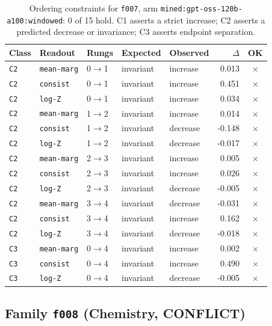 \documentclass[11pt]{article}
\begin{document}
\begin{table}[htbp]
\centering
\small
\caption{Ordering constraints for \texttt{f007}, arm \texttt{mined:gpt-oss-120b-a100:windowed}: 0 of 15 hold. C1 asserts a strict increase; C2 asserts a predicted decrease or invariance; C3 asserts endpoint separation.}
\label{tab:ladder-f007-mined-gpt-oss-120b-a100-windowed}
\begin{tabular}{lllllrc}
\toprule
Class & Readout & Rungs & Expected & Observed & $\Delta$ & OK \\
\midrule
\texttt{C2} & \texttt{mean-marg} & 0$\to$1 & invariant & increase & 0.013 & $\times$ \\
\texttt{C2} & \texttt{consist} & 0$\to$1 & invariant & increase & 0.451 & $\times$ \\
\texttt{C2} & \texttt{log-Z} & 0$\to$1 & invariant & increase & 0.034 & $\times$ \\
\texttt{C2} & \texttt{mean-marg} & 1$\to$2 & invariant & increase & 0.014 & $\times$ \\
\texttt{C2} & \texttt{consist} & 1$\to$2 & invariant & decrease & -0.148 & $\times$ \\
\texttt{C2} & \texttt{log-Z} & 1$\to$2 & invariant & decrease & -0.017 & $\times$ \\
\texttt{C2} & \texttt{mean-marg} & 2$\to$3 & invariant & increase & 0.005 & $\times$ \\
\texttt{C2} & \texttt{consist} & 2$\to$3 & invariant & increase & 0.026 & $\times$ \\
\texttt{C2} & \texttt{log-Z} & 2$\to$3 & invariant & decrease & -0.005 & $\times$ \\
\texttt{C2} & \texttt{mean-marg} & 3$\to$4 & invariant & decrease & -0.031 & $\times$ \\
\texttt{C2} & \texttt{consist} & 3$\to$4 & invariant & increase & 0.162 & $\times$ \\
\texttt{C2} & \texttt{log-Z} & 3$\to$4 & invariant & decrease & -0.018 & $\times$ \\
\texttt{C3} & \texttt{mean-marg} & 0$\to$4 & invariant & increase & 0.002 & $\times$ \\
\texttt{C3} & \texttt{consist} & 0$\to$4 & invariant & increase & 0.490 & $\times$ \\
\texttt{C3} & \texttt{log-Z} & 0$\to$4 & invariant & decrease & -0.005 & $\times$ \\
\bottomrule
\end{tabular}
\end{table}

\subsection*{Family \texttt{f008} (Chemistry, CONFLICT)}
\end{document}
